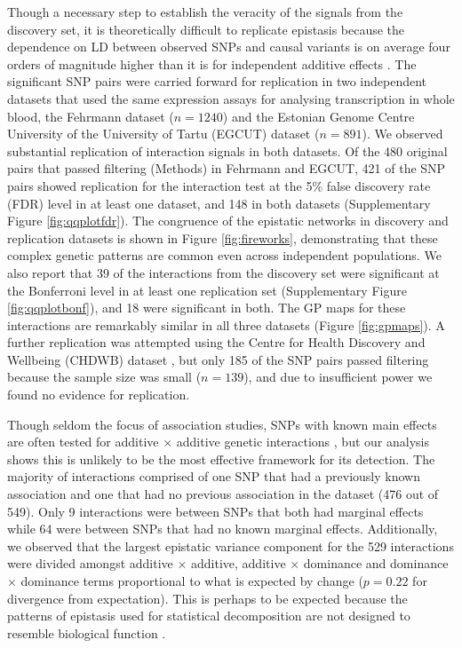 \documentclass{article}
\begin{document}
Though a necessary step to establish the veracity of the signals from the discovery set, it is theoretically difficult to replicate epistasis because the dependence on LD between observed SNPs and causal variants is on average four orders of magnitude higher than it is for independent additive effects \cite{Weir2008, Hemani2013}. The significant SNP pairs were carried forward for replication in two independent datasets that used the same expression assays for analysing transcription in whole blood, the Fehrmann dataset \cite{Fehrmann2011} ($n=1240$) and the Estonian Genome Centre University of the University of Tartu (EGCUT) dataset \cite{Metspalu2004} ($n=891$). We observed substantial replication of interaction signals in both datasets. Of the 480 original pairs that passed filtering (Methods) in Fehrmann and EGCUT, 421 of the SNP pairs showed replication for the interaction test at the 5\% false discovery rate (FDR) level in at least one dataset, and 148 in both datasets (Supplementary Figure \ref{fig:qqplotfdr}). The congruence of the epistatic networks in discovery and replication datasets is shown in Figure \ref{fig:fireworks}, demonstrating that these complex genetic patterns are common even across independent populations. We also report that 39 of the interactions from the discovery set were significant at the Bonferroni level in at least one replication set (Supplementary Figure \ref{fig:qqplotbonf}), and 18 were significant in both. The GP maps for these interactions are remarkably similar in all three datasets (Figure \ref{fig:gpmaps}). A further replication was attempted using the Centre for Health Discovery and Wellbeing (CHDWB) dataset \cite{Preininger2013}, but only 185 of the SNP pairs passed filtering because the sample size was small ($n=139$), and due to insufficient power we found no evidence for replication.


Though seldom the focus of association studies, SNPs with known main effects are often tested for additive $\times$ additive genetic interactions \cite{Cordell2009}, but our analysis shows this is unlikely to be the most effective framework for its detection. The majority of interactions comprised of one SNP that had a previously known association and one that had no previous association in the dataset \cite{Powell2013} (476 out of 549). Only 9 interactions were between SNPs that both had marginal effects while 64 were between SNPs that had no known marginal effects. Additionally, we observed that the largest epistatic variance component for the 529 interactions were divided amongst additive $\times$ additive, additive $\times$ dominance and dominance $\times$ dominance terms proportional to what is expected by change ($p = 0.22$ for divergence from expectation). This is perhaps to be expected because the patterns of epistasis used for statistical decomposition are not designed to resemble biological function \cite{Cockerham1954}.
\end{document}
